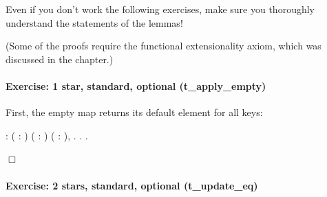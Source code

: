 \documentclass[12pt]{report}
\begin{document}
 Even if you don't work the following exercises, make sure
    you thoroughly understand the statements of the lemmas! 

 (Some of the proofs require the functional extensionality axiom,
    which was discussed in the  chapter.) 

\paragraph{Exercise: 1 star, standard, optional (t\_apply\_empty)}




    First, the empty map returns its default element for all keys: 
\begin{coqdoccode}
\coqdocemptyline
\coqdocnoindent
{}  : \coqdockw{\ensuremath{\forall}} ( : ) ( : ) ( : ),\coqdoceol
\coqdocindent{1.00em}
     .\coqdoceol
\coqdocnoindent
{}.\coqdoceol
 .\coqdoceol
\end{coqdoccode}
\ensuremath{\Box} 

\paragraph{Exercise: 2 stars, standard, optional (t\_update\_eq)}
\end{document}
